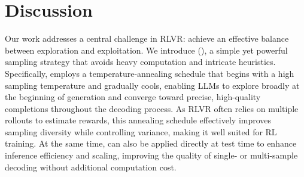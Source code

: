\section{Discussion}
Our work addresses a central challenge in RLVR: achieve an effective balance between exploration and exploitation.
%
We introduce \algname (\alg), a simple yet powerful sampling strategy that avoids heavy computation and intricate heuristics.
%
Specifically, \alg employs a temperature-annealing schedule that begins with a high sampling temperature and gradually cools, enabling LLMs to explore broadly at the beginning of generation and converge toward precise, high-quality completions throughout the decoding process.
%
As RLVR often relies on multiple rollouts to estimate rewards, this annealing schedule effectively improves sampling diversity while controlling variance, making it well suited for RL training.
%
At the same time, \alg can also be applied directly at test time to enhance inference efficiency and scaling, improving the quality of single- or multi-sample decoding without additional computation cost.

%
%


